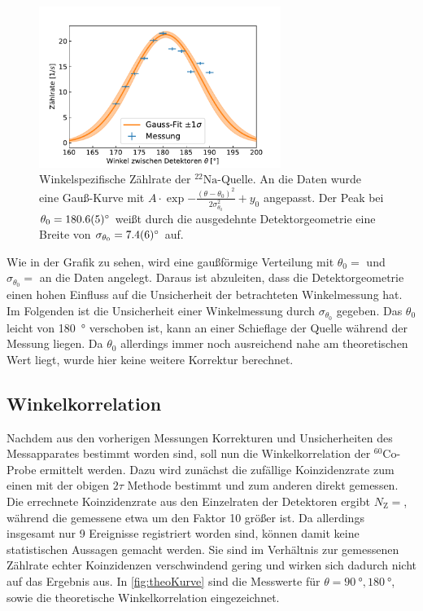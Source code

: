 	\begin{figure}[ht]
		\centering
		\includegraphics[width=0.7\textwidth]{dat/vernichtung.pdf}
		\caption{Winkelspezifische Zählrate der $^{22}\text{Na}$-Quelle.
			An die Daten wurde eine Gauß-Kurve mit $A \cdot \exp{-\frac{(\theta - \theta_0)^2}{2 \sigma_{\theta_0}^2}} + y_0$ angepasst.
			Der Peak bei $\theta_0 = \SI{180,6 \pm 0,5}{\degree}$ weißt durch die ausgedehnte Detektorgeometrie eine Breite von $\sigma_{\theta_0} = \SI{7,4 \pm 0,6}{\degree}$ auf.}
		\label{fig:vernichtung}
	\end{figure}

	Wie in der Grafik zu sehen, wird eine gaußförmige Verteilung mit $\theta_0 = $ und $\sigma_{\theta_0} = $ an die Daten angelegt.
	Daraus ist abzuleiten, dass die Detektorgeometrie einen hohen Einfluss auf die Unsicherheit der betrachteten Winkelmessung hat.
	Im Folgenden ist die Unsicherheit einer Winkelmessung durch $\sigma_{\theta_0}$ gegeben.
	Das $\theta_0$ leicht von \SI{180}{\degree} verschoben ist, kann an einer Schieflage der Quelle während der Messung liegen.
	Da $\theta_0$ allerdings immer noch ausreichend nahe am theoretischen Wert liegt, wurde hier keine weitere Korrektur berechnet.
	
	

\subsection{Winkelkorrelation}

	Nachdem aus den vorherigen Messungen Korrekturen und Unsicherheiten des Messapparates bestimmt worden sind, soll nun die Winkelkorrelation der $^{60}\text{Co}$-Probe ermittelt werden.
	Dazu wird zunächst die zufällige Koinzidenzrate zum einen mit der obigen $2\tau$ Methode bestimmt und zum anderen direkt gemessen.
	Die errechnete Koinzidenzrate aus den Einzelraten der Detektoren ergibt $N_\text{Z} = $, während die gemessene etwa um den Faktor 10 größer ist.
	Da allerdings insgesamt nur 9 Ereignisse registriert worden sind, können damit keine statistischen Aussagen gemacht werden.
	Sie sind im Verhältnis zur gemessenen Zählrate echter Koinzidenzen verschwindend gering und wirken sich dadurch nicht auf das Ergebnis aus.
	In \cref{fig:theoKurve} sind die Messwerte für $\theta = \SI{90}{\degree}, \SI{180}{\degree}$, sowie die theoretische Winkelkorrelation eingezeichnet.
	
